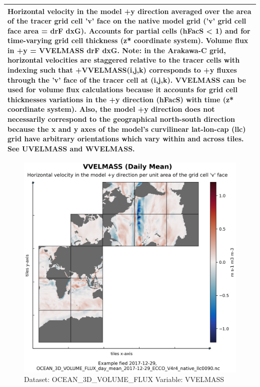 \begin{longtable}{|p{}|p{}|p{}|p{}|}
\multicolumn{4}{|p{1\textwidth}|}{Horizontal velocity in the model +y direction averaged over the area of the tracer grid cell 'v' face on the native model grid ('v' grid cell face area = drF dxG). Accounts for partial cells (hFacS < 1) and for time-varying grid cell thickness (z* coordinate system). Volume flux in +y = VVELMASS drF dxG. Note: in the Arakawa-C grid, horizontal velocities are staggered relative to the tracer cells with indexing such that +VVELMASS(i,j,k) corresponds to +y fluxes through the 'v' face of the tracer cell at (i,j,k). VVELMASS can be used for volume flux calculations because it accounts for grid cell thicknesses variations in the +y direction (hFacS) with time (z* coordinate system). Also, the model +y direction does not necessarily correspond to the geographical north-south direction because the x and y axes of the model's curvilinear lat-lon-cap (llc) grid have arbitrary orientations which vary within and across tiles. See UVELMASS and WVELMASS.} \\ \hline
\end{longtable}

\begin{figure}[H]
\centering
\includegraphics[width=\textwidth]{../images/plots/native_plots/Ocean_Three-Dimensional_Volume_Fluxes/VVELMASS.png}
\caption{Dataset: OCEAN\_3D\_VOLUME\_FLUX Variable: VVELMASS}
\label{tab:table-OCEAN_3D_VOLUME_FLUX_VVELMASS-Plot}
\end{figure}
\pagebreak
